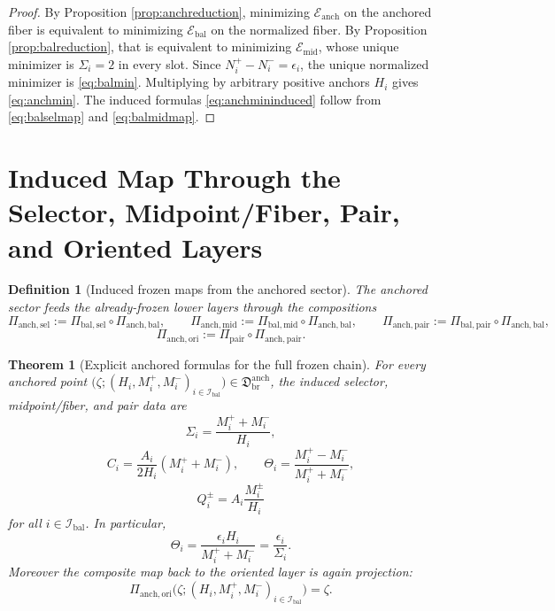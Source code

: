 \documentclass[11pt]{article}
\newcommand{\PairMap}{\Pi_{\mathrm{pair}}}
\newcommand{\SelEnergy}{\mathscr E_{\mathrm{mid}}}
\newcommand{\BalSelMap}{\Pi_{\mathrm{bal,sel}}}
\newcommand{\BalMidMap}{\Pi_{\mathrm{bal,mid}}}
\newcommand{\BalPairMap}{\Pi_{\mathrm{bal,pair}}}
\newcommand{\BalEnergy}{\mathscr E_{\mathrm{bal}}}
\newcommand{\BalOriginSector}{\mathfrak D_{\mathrm{br}}^{\mathrm{anch}}}
\newcommand{\BalOriginMap}{\Pi_{\mathrm{anch,bal}}}
\newcommand{\AnchSelMap}{\Pi_{\mathrm{anch,sel}}}
\newcommand{\AnchMidMap}{\Pi_{\mathrm{anch,mid}}}
\newcommand{\AnchPairMap}{\Pi_{\mathrm{anch,pair}}}
\newcommand{\AnchOriginMap}{\Pi_{\mathrm{anch,ori}}}
\newcommand{\AnchEnergy}{\mathscr E_{\mathrm{anch}}}
\newcommand{\BalIndex}{\mathcal I_{\mathrm{bal}}}
\newtheorem{definition}{Definition}
\newtheorem{theorem}{Theorem}
\begin{document}
\begin{proof}
By Proposition \ref{prop:anchreduction}, minimizing \(\AnchEnergy\) on the anchored fiber is equivalent to minimizing \(\BalEnergy\) on the normalized fiber. By Proposition \ref{prop:balreduction}, that is equivalent to minimizing \(\SelEnergy\), whose unique minimizer is \(\Sigma_i=2\) in every slot. Since \(N_i^+-N_i^-=\epsilon_i\), the unique normalized minimizer is \eqref{eq:balmin}. Multiplying by arbitrary positive anchors \(H_i\) gives \eqref{eq:anchmin}. The induced formulas \eqref{eq:anchmininduced} follow from \eqref{eq:balselmap} and \eqref{eq:balmidmap}.
\end{proof}

\section{Induced Map Through the Selector, Midpoint/Fiber, Pair, and Oriented Layers}

\begin{definition}[Induced frozen maps from the anchored sector]
\label{def:inducedmaps}
The anchored sector feeds the already-frozen lower layers through the compositions
\begin{equation}
\AnchSelMap:=\BalSelMap\circ\BalOriginMap,
\qquad
\AnchMidMap:=\BalMidMap\circ\BalOriginMap,
\qquad
\AnchPairMap:=\BalPairMap\circ\BalOriginMap,
\label{eq:inducedmapsA}
\end{equation}
\begin{equation}
\AnchOriginMap:=\PairMap\circ\AnchPairMap.
\label{eq:inducedmapsB}
\end{equation}
\end{definition}

\begin{theorem}[Explicit anchored formulas for the full frozen chain]
\label{thm:anchchain}
For every anchored point \(\bigl(\zeta;(H_i,M_i^+,M_i^-)_{i\in\BalIndex}\bigr)\in\BalOriginSector\), the induced selector, midpoint/fiber, and pair data are
\begin{equation}
\Sigma_i=\frac{M_i^++M_i^-}{H_i},
\label{eq:anchsigma}
\end{equation}
\begin{equation}
C_i=\frac{A_i}{2H_i}(M_i^++M_i^-),
\qquad
\Theta_i=\frac{M_i^+-M_i^-}{M_i^++M_i^-},
\label{eq:anchmidtheta}
\end{equation}
\begin{equation}
Q_i^\pm=A_i\frac{M_i^\pm}{H_i}
\label{eq:anchpair}
\end{equation}
for all \(i\in\BalIndex\). In particular,
\begin{equation}
\Theta_i
=
\frac{\epsilon_i H_i}{M_i^++M_i^-}
=
\frac{\epsilon_i}{\Sigma_i}.
\label{eq:anchtheta}
\end{equation}
Moreover the composite map back to the oriented layer is again projection:
\begin{equation}
\AnchOriginMap\bigl(\zeta;(H_i,M_i^+,M_i^-)_{i\in\BalIndex}\bigr)=\zeta.
\label{eq:anchprojection}
\end{equation}
\end{theorem}
\end{document}
